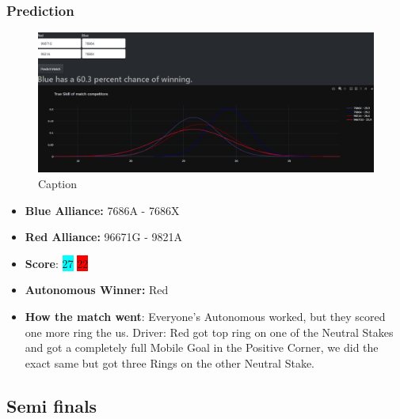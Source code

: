 \subsubsection*{Prediction}
\begin{figure}[H]
    \centering
    \includegraphics[width=0.8\linewidth]{images/QFND.png}
    \caption{Caption}
    \label{fig:enter-label}
\end{figure}
\begin{itemize}
    \item \textbf{Blue Alliance:} 7686A - 7686X
    \item \textbf{Red Alliance:} 96671G - 9821A
    \item \textbf{Score}: \colorbox{cyan}{27}
    \colorbox{red}{22}
    \item \textbf{Autonomous Winner:} Red
    \item \textbf{How the match went}: Everyone's Autonomous worked, but they scored one more ring the us. Driver: Red got top ring on one of the Neutral Stakes and got a completely full Mobile Goal in the Positive Corner, we did the exact same but got three Rings on the other Neutral Stake.
\end{itemize}
\subsection*{Semi finals}
